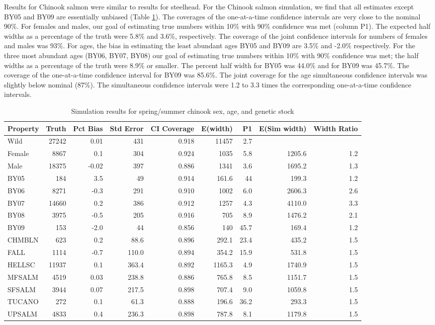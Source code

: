 \documentclass[11pt]{article}
\begin{document}
Results for Chinook salmon were similar to results for steelhead. For the Chinook salmon simulation, we find that all estimates except BY05 and BY09 are essentially unbiased (Table \ref{table:CHsimresults}). The coverages of the one-at-a-time confidence intervals are very close to the nominal 90\%. For females and males, our goal of estimating true numbers within 10\% with 90\% confidence was met (column P1). The expected half widths as a percentage of the truth were 5.8\% and 3.6\%, respectively. The coverage of the joint confidence intervals for numbers of females and males was 93\%. For ages, the bias in estimating the least abundant ages BY05 and BY09 are 3.5\% and -2.0\% respectively. For the three most abundant ages (BY06, BY07, BY08) our goal of estimating true numbers within 10\% with 90\% confidence was met; the half widths as a percentage of the truth were 8.9\% or smaller. The percent half width for BY05 was 44.0\% and for BY09 was 45.7\%. The coverage of the one-at-a-time confidence interval for BY09 was 85.6\%. The joint coverage for the age simultaneous confidence intervals was slightly below nominal (87\%). The simultaneous confidence intervals were 1.2 to 3.3 times the corresponding one-at-a-time confidence intervals.

\begin{table} %
\caption{Simulation results for spring/summer chinook sex, age, and genetic stock}
\label{table:CHsimresults}
\footnotesize
\begin{tabular}{ | l | r | r | r | r | r | r | r | r | }
\hline
Property&Truth&Pct Bias&Std Error&CI Coverage&E(width)&P1&E(Sim width)&Width Ratio \\ \hline
Wild&27242&0.01&431&0.918&11457&2.7&& \\ \hline
Female&8867&0.1&304&0.924&1035&5.8&1205.6&1.2 \\ \hline
Male&18375&-0.02&397&0.886&1341&3.6&1695.2&1.3 \\ \hline
BY05&184&3.5&49&0.914&161.6&44&199.3&1.2 \\ \hline
BY06&8271&-0.3&291&0.910&1002&6.0&2606.3&2.6 \\ \hline
BY07&14660&0.2&386&0.912&1257&4.3&4110.0&3.3 \\ \hline
BY08&3975&-0.5&205&0.916&705&8.9&1476.2&2.1 \\ \hline
BY09&153&-2.0&44&0.856&140&45.7&169.4&1.2 \\ \hline
CHMBLN&623&0.2&88.6&0.896&292.1&23.4&435.2&1.5 \\ \hline
FALL&1114&-0.7&110.0&0.894&354.2&15.9&531.8&1.5 \\ \hline
HELLSC&11937&0.1&363.4&0.892&1165.3&4.9&1740.9&1.5 \\ \hline
MFSALM&4519&0.03&238.8&0.886&765.8&8.5&1151.7&1.5 \\ \hline
SFSALM&3944&0.07&217.5&0.898&707.4&9.0&1059.8&1.5 \\ \hline
TUCANO&272&0.1&61.3&0.888&196.6&36.2&293.3&1.5 \\ \hline
UPSALM&4833&0.4&236.3&0.898&787.8&8.1&1179.8&1.5 \\ \hline
\end{tabular}
\end{table}
\end{document}
